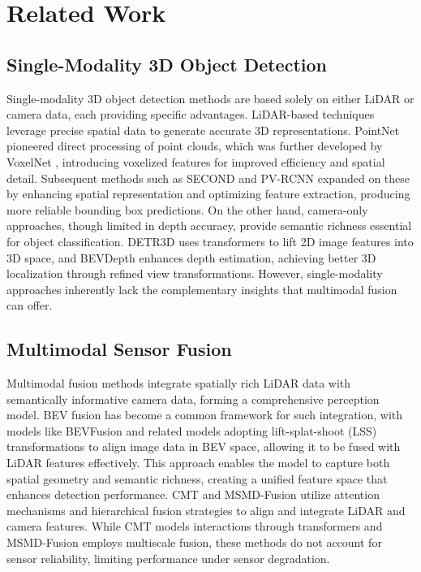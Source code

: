 \section{Related Work}
\label{sec:Related}

\subsection {Single-Modality 3D Object Detection}
Single-modality 3D object detection methods are based solely on either LiDAR or camera data, each providing specific advantages. LiDAR-based techniques leverage precise spatial data to generate accurate 3D representations. PointNet \cite{qi2017pointnet++} pioneered direct processing of point clouds, which was further developed by VoxelNet \cite{zhou2018voxelnet}, introducing voxelized features for improved efficiency and spatial detail. Subsequent methods such as SECOND \cite{yan2018second} and PV-RCNN \cite{shi2020pv} expanded on these by enhancing spatial representation and optimizing feature extraction, producing more reliable bounding box predictions. On the other hand, camera-only approaches, though limited in depth accuracy, provide semantic richness essential for object classification. DETR3D \cite{wang2022detr3d} uses transformers to lift 2D image features into 3D space, and BEVDepth \cite{li2023bevdepth} enhances depth estimation, achieving better 3D localization through refined view transformations. However, single-modality approaches inherently lack the complementary insights that multimodal fusion can offer.

\subsection{ Multimodal Sensor Fusion}
Multimodal fusion methods integrate spatially rich LiDAR data with semantically informative camera data, forming a comprehensive perception model. BEV fusion has become a common framework for such integration, with models like BEVFusion \cite{liang2022bevfusion,liu2023bevfusion} and related models \cite{jiao2023msmdfusion,li2024gafusion} adopting lift-splat-shoot (LSS) transformations \cite{philion2020lift} to align image data in BEV space, allowing it to be fused with LiDAR features effectively. This approach enables the model to capture both spatial geometry and semantic richness, creating a unified feature space that enhances detection performance. CMT \cite{yan2023cross} and MSMD-Fusion \cite{jiao2023msmdfusion} utilize attention mechanisms and hierarchical fusion strategies to align and integrate LiDAR and camera features. While CMT models interactions through transformers and MSMD-Fusion employs multiscale fusion, these methods do not account for sensor reliability, limiting performance under sensor degradation.



